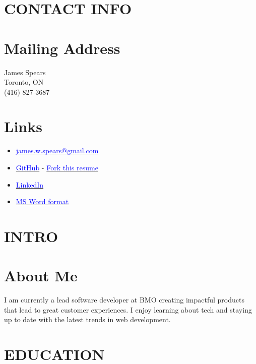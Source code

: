 \documentclass[margin]{res}
\begin{document}
\name{\textcolor{NavyBlue}{James Spears} - \textcolor{black}{\bf Development Lead} }

\begin{resume}

	\section{\textcolor{NavyBlue}{CONTACT INFO}}

	\normalsize{\section{Mailing Address}}
	{James Spears \\ Toronto, ON \\ (416) 827-3687}

	\normalsize{\section{Links}}
	\begin{itemize}
		\item \href{mailto:james.w.spears@gmail.com}{\textcolor{blue}{james.w.spears@gmail.com}}
		\item \href{https://github.com/jameswspears}{\textcolor{blue}{GitHub}} - \href{https://github.com/jameswspears/resume}{\textcolor{blue}{Fork this resume}}
		\item \href{https://www.linkedin.com/in/james-spears-50834b8a/}{\textcolor{blue}{LinkedIn}}
		\item \href{https://s3.amazonaws.com/james-spears.com/resume.docx}{\textcolor{blue}{MS Word format}}
	\end{itemize}

	\section{\textcolor{NavyBlue}{INTRO}}

	\normalsize{\section{About Me}}
	I am currently a lead software developer at BMO creating impactful products that lead to great customer experiences.
	I enjoy learning about tech and staying up to date with the latest trends in web development.
	\section{\textcolor{NavyBlue}{EDUCATION}}


\end{resume}
\end{document}
